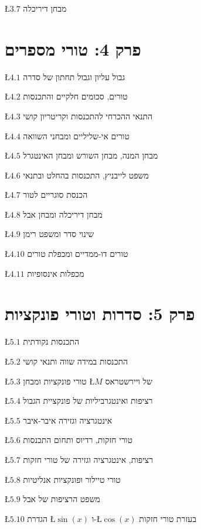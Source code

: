 \documentclass[english,hebrew]{article}
\begin{document}
\L{$3.7$} מבחן דיריכלה

\section{פרק 4: טורי מספרים}

\L{$4.1$} גבול עליון וגבול תחתון של סדרה

\L{$4.2$} טורים, סכומים חלקיים והתכנסות

\L{$4.3$} התנאי ההכרחי להתכנסות וקריטריון קושי

\L{$4.4$} טורים אי-שליליים ומבחני השוואה

\L{$4.5$} מבחן המנה, מבחן השורש ומבחן האינטגרל

\L{$4.6$} משפט לייבניץ, התכנסות בהחלט ובתנאי

\L{$4.7$} הכנסת סוגריים לטור

\L{$4.8$} מבחן דיריכלה ומבחן אבל

\L{$4.9$} שינוי סדר ומשפט רימן

\L{$4.10$} טורים דו-ממדיים ומכפלת טורים

\L{$4.11$} מכפלות אינסופיות

\section{פרק 5: סדרות וטורי פונקציות}

\L{$5.1$} התכנסות נקודתית

\L{$5.2$} התכנסות במידה שווה ותנאי קושי

\L{$5.3$} טורי פונקציות ומבחן \L{$M$} של ויירשטראס

\L{$5.4$} רציפות ואינטגרביליות של פונקציית הגבול

\L{$5.5$} אינטגרציה וגזירה איבר-איבר

\L{$5.6$} טורי חזקות, רדיוס ותחום התכנסות

\L{$5.7$} רציפות, אינטגרציה וגזירה של טורי חזקות

\L{$5.8$} טורי טיילור ופונקציות אנליטיות

\L{$5.9$} משפט הרציפות של אבל

\L{$5.10$} הגדרת \L{$\sin(x)$} ו-\L{$\cos(x)$} בעזרת טורי חזקות
\end{document}
